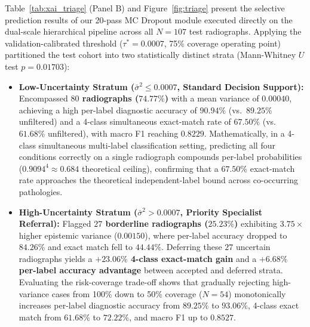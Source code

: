 \documentclass[review]{elsarticle}
\begin{document}
Table~\ref{tab:xai_triage} (Panel B) and Figure~\ref{fig:triage} present the selective prediction results of our 20-pass MC Dropout module executed directly on the dual-scale hierarchical pipeline across all $N=107$ test radiographs. Applying the validation-calibrated threshold ($\tau^* = 0.0007$, 75\% coverage operating point) partitioned the test cohort into two statistically distinct strata (Mann-Whitney $U$ test $p = 0.01703$):
\begin{itemize}
    \item \textbf{Low-Uncertainty Stratum ($\bar{\sigma}^2 \le 0.0007$, Standard Decision Support):} Encompassed \textbf{$80$ radiographs ($74.77\%$)} with a mean variance of $0.00040$, achieving a high per-label diagnostic accuracy of \textbf{$90.94\%$} (vs.\ $89.25\%$ unfiltered) and a 4-class simultaneous exact-match rate of \textbf{$67.50\%$} (vs.\ $61.68\%$ unfiltered), with macro F1 reaching $0.8229$. Mathematically, in a 4-class simultaneous multi-label classification setting, predicting all four conditions correctly on a single radiograph compounds per-label probabilities ($0.9094^4 \approx 0.684$ theoretical ceiling), confirming that a $67.50\%$ exact-match rate approaches the theoretical independent-label bound across co-occurring pathologies.
    \item \textbf{High-Uncertainty Stratum ($\bar{\sigma}^2 > 0.0007$, Priority Specialist Referral):} Flagged \textbf{$27$ borderline radiographs ($25.23\%$)} exhibiting $3.75\times$ higher epistemic variance ($0.00150$), where per-label accuracy dropped to $84.26\%$ and exact match fell to $44.44\%$. Deferring these $27$ uncertain radiographs yields a \textbf{$+23.06\%$ 4-class exact-match gain} and a \textbf{$+6.68\%$ per-label accuracy advantage} between accepted and deferred strata. Evaluating the risk-coverage trade-off shows that gradually rejecting high-variance cases from 100\% down to 50\% coverage ($N=54$) monotonically increases per-label diagnostic accuracy from $89.25\%$ to \textbf{$93.06\%$}, 4-class exact match from $61.68\%$ to \textbf{$72.22\%$}, and macro F1 up to \textbf{$0.8527$}.
\end{itemize}
\end{document}
